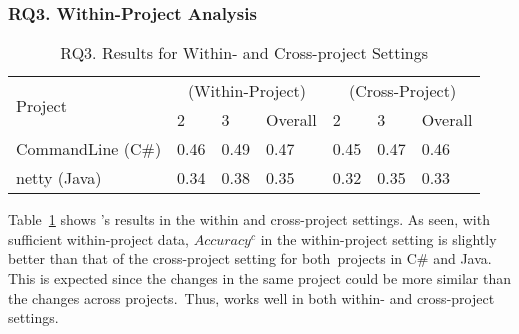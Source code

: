 \subsubsection{{\bf RQ3. Within-Project Analysis}}

\begin{table}[t]
	\caption{RQ3. Results for Within- and Cross-project Settings}
	\vspace{-12pt}
	\begin{center}
		\footnotesize
		\tabcolsep 3pt
		\renewcommand{\arraystretch}{1} \begin{tabular}{p{2cm}<{\centering}|p{0.8cm}<{\centering}p{0.8cm}<{\centering}p{0.8cm}<{\centering}|p{0.8cm}<{\centering}p{0.8cm}<{\centering}p{0.8cm}<{\centering}}
			
			\hline
			\multirow{2}{*}{Project}     & \multicolumn{3}{c|}{\tool (Within-Project)} & \multicolumn{3}{c}{\tool (Cross-Project)}\\
			\cline{2-7}
			                               &        2       &      3         & Overall  &      2       &        3     & Overall    \\
			
			\hline
			CommandLine (C\#)   &  0.46  & 0.49  &     0.47          &	0.45   & 0.47 &	0.46	       \\
                        netty (Java)   &  0.34  & 0.38  &     0.35          &	0.32   & 0.35 &	0.33	       \\

			\hline
		\end{tabular}
		\label{RQ3-result}
		
	\end{center}
\end{table}


Table~\ref{RQ3-result} shows {\tool}'s results
in the within and cross-project settings. As seen, with sufficient
within-project data, $Accuracy^{c}$ in the within-project setting is
slightly better than that of the cross-project setting for
both~projects in C\# and Java.
This is expected since the changes in the same project could be
more similar than the changes across projects.~Thus, {\tool} works
well in both within- and cross-project settings.

